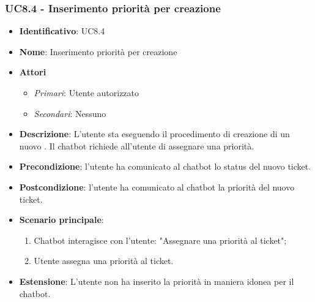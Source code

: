 \subsubsection{UC8.4 - Inserimento priorità per creazione }
\begin{itemize}
	\item \textbf{Identificativo}: UC8.4
	\item \textbf{Nome}: Inserimento priorità per creazione 
	\item \textbf{Attori}
	\begin{itemize} 
		\item \textit{Primari}: Utente autorizzato
		\item \textit{Secondari}: Nessuno
	\end{itemize}
	\item \textbf{Descrizione}: L'utente sta eseguendo il procedimento di creazione di un nuovo . Il chatbot richiede all'utente di assegnare una priorità.
	\item \textbf{Precondizione}: l'utente ha comunicato al chatbot lo status del nuovo ticket.
	\item \textbf{Postcondizione}: l'utente ha comunicato al chatbot la priorità del nuovo ticket.
	\item \textbf{Scenario principale}: \begin{enumerate}
		\item Chatbot interagisce con l'utente: "Assegnare una priorità al ticket";
		\item Utente assegna una priorità al ticket.
	\end{enumerate}
	\item \textbf{Estensione}: L'utente non ha inserito la priorità in maniera idonea per il chatbot.  
\end{itemize}
